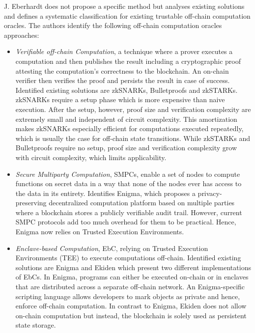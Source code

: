 
J. Eberhardt \cite{Eberhardt2018Off-chainingComputations} does not propose a specific method but analyses existing solutions and defines a systematic classification for existing trustable off-chain computation oracles. The authors identify the following off-chain computation oracles approaches:



\begin{itemize}
  \item \textit{Verifiable off-chain Computation}, a technique where a prover executes a computation and then publishes the result including a cryptographic proof attesting the computation’s correctness to the blockchain. An on-chain verifier then verifies the proof and persists the result in case of success. Identified existing solutions are zkSNARKs, Bulletproofs and zkSTARKs. zkSNARKs require a setup phase which is more expensive than naive execution. After the setup, however, proof size and verification complexity are extremely small and independent of circuit complexity. This amortization makes zkSNARKs especially efficient for computations executed repeatedly, which is usually the case for off-chain state transitions. While zkSTARKs and Bulletproofs require no setup, proof size and verification complexity grow with circuit complexity, which limits applicability.
  \item \textit{Secure Multiparty Computation}, SMPCs, enable a set of nodes to compute functions on secret data in a way that none of the nodes ever has access to the data in its entirety. Identifies Enigma, which proposes a privacy-preserving decentralized computation platform based on multiple parties where a blockchain stores a publicly verifiable audit trail. However, current SMPC protocols add too much overhead for them to be practical. Hence, Enigma now relies on Trusted Execution Environments.


  \item \textit{Enclave-based Computation}, EbC, relying on Trusted Execution Environments (TEE) to execute computations off-chain. Identified existing solutions are Enigma and Ekiden which present two different implementations of EbCs. In Enigma, programs can either be executed on-chain or in enclaves that are distributed across a separate off-chain network. An Enigma-specific scripting language allows developers to mark objects as private and hence, enforce off-chain computation. In contrast to Enigma, Ekiden does not allow on-chain computation but instead, the blockchain is solely used as persistent state storage.


\end{itemize}
